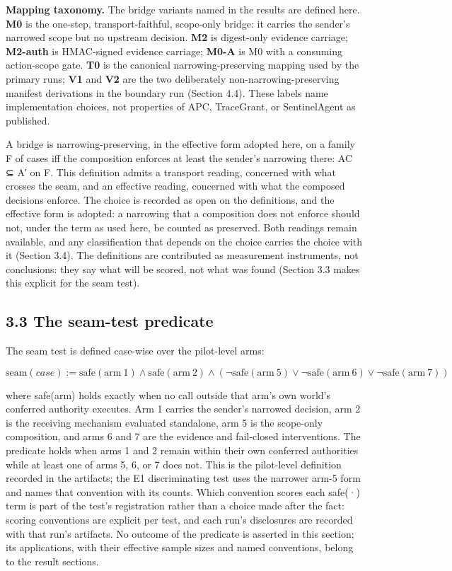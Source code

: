 \documentclass[
  10pt,
]{article}
\renewcommand{\_}{\origunderscore\allowbreak}
\begin{document}
\textbf{Mapping taxonomy.} The bridge variants named in the results are
defined here. \textbf{M0} is the one-step, transport-faithful,
scope-only bridge: it carries the sender's narrowed scope but no
upstream decision. \textbf{M2} is digest-only evidence carriage;
\textbf{M2-auth} is HMAC-signed evidence carriage; \textbf{M0-A} is M0
with a consuming action-scope gate. \textbf{T0} is the canonical
narrowing-preserving mapping used by the primary runs; \textbf{V1} and
\textbf{V2} are the two deliberately non-narrowing-preserving manifest
derivations in the boundary run (Section 4.4). These labels name
implementation choices, not properties of APC, TraceGrant, or
SentinelAgent as published.

A bridge is narrowing-preserving, in the effective form adopted here, on
a family F of cases iff the composition enforces at least the sender's
narrowing there: A\_C ⊆ A′ on F. This definition admits a transport
reading, concerned with what crosses the seam, and an effective reading,
concerned with what the composed decisions enforce. The choice is
recorded as open on the definitions, and the effective form is adopted:
a narrowing that a composition does not enforce should not, under the
term as used here, be counted as preserved. Both readings remain
available, and any classification that depends on the choice carries the
choice with it (Section 3.4). The definitions are contributed as
measurement instruments, not conclusions: they say what will be scored,
not what was found (Section 3.3 makes this explicit for the seam test).

\subsection{3.3 The seam-test predicate}\label{the-seam-test-predicate}

The seam test is defined case-wise over the pilot-level arms:

\[\mathrm{seam}(case) := \mathrm{safe}(\mathrm{arm}\ 1) \land \mathrm{safe}(\mathrm{arm}\ 2) \land (\lnot \mathrm{safe}(\mathrm{arm}\ 5) \lor \lnot \mathrm{safe}(\mathrm{arm}\ 6) \lor \lnot \mathrm{safe}(\mathrm{arm}\ 7))\]

where safe(arm) holds exactly when no call outside that arm's own
world's conferred authority executes. Arm 1 carries the sender's
narrowed decision, arm 2 is the receiving mechanism evaluated
standalone, arm 5 is the scope-only composition, and arms 6 and 7 are
the evidence and fail-closed interventions. The predicate holds when
arms 1 and 2 remain within their own conferred authorities while at
least one of arms 5, 6, or 7 does not. This is the pilot-level
definition recorded in the artifacts; the E1 discriminating test uses
the narrower arm-5 form and names that convention with its counts. Which
convention scores each safe(·) term is part of the test's registration
rather than a choice made after the fact: scoring conventions are
explicit per test, and each run's disclosures are recorded with that
run's artifacts. No outcome of the predicate is asserted in this
section; its applications, with their effective sample sizes and named
conventions, belong to the result sections.
\end{document}
